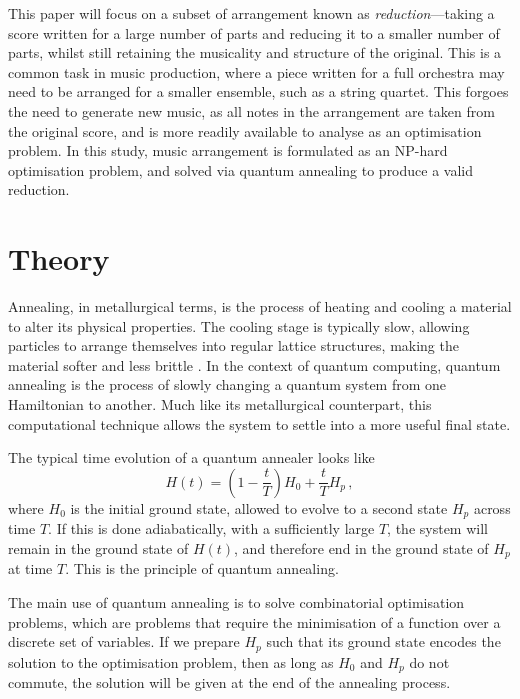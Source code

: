 \documentclass[aps,pra,10pt,twocolumn]{revtex4-2}
\begin{document}
This paper will focus on a subset of arrangement known as \textit{reduction}—taking a score written for a large number of parts and reducing it to a smaller number of parts, whilst still retaining the musicality and structure of the original. This is a common task in music production, where a piece written for a full orchestra may need to be arranged for a smaller ensemble, such as a string quartet. This forgoes the need to generate new music, as all notes in the arrangement are taken from the original score, and is more readily available to analyse as an optimisation problem. In this study, music arrangement is formulated as an NP-hard optimisation problem, and solved via quantum annealing to produce a valid reduction.

\section{Theory}

Annealing, in metallurgical terms, is the process of heating and cooling a material to alter its physical properties. The cooling stage is typically slow, allowing particles to arrange themselves into regular lattice structures, making the material softer and less brittle \cite{oed_annealing_2024}. In the context of quantum computing, quantum annealing is the process of slowly changing a quantum system from one Hamiltonian to another. Much like its metallurgical counterpart, this computational technique allows the system to settle into a more useful final state.

The typical time evolution of a quantum annealer looks like
\begin{equation}
    H(t)=\left(1- \frac{t}{T}\right)H_0 + \frac{t}{T}H_p \,,
    \label{eq:time-evolution}
\end{equation}
where $H_0$ is the initial ground state, allowed to evolve to a second state $H_p$ across time $T$. If this is done adiabatically, with a sufficiently large $T$, the system will remain in the ground state of $H(t)$, and therefore end in the ground state of $H_p$ at time $T$. This is the principle of quantum annealing.

The main use of quantum annealing is to solve combinatorial optimisation problems, which are problems that require the minimisation of a function over a discrete set of variables. If we prepare $H_p$ such that its ground state encodes the solution to the optimisation problem, then as long as $H_0$ and $H_p$ do not commute, the solution will be given at the end of the annealing process.
\end{document}
